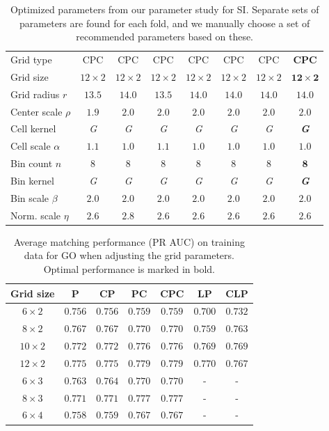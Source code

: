 \documentclass[thesis.tex]{subfiles}
\begin{document}
\begin{table}[p]
{\begin{tabular}{ l c c c c c c c}
Grid type & CPC & CPC & CPC & CPC & CPC & CPC & \textbf{CPC} \\
Grid size & $12 \times 2$ & $12 \times 2$ & $12 \times 2$ & $12 \times 2$ & $12 \times 2$ & $12 \times 2$ & \textbf{$\mathbf{12 \times 2}$} \\
Grid radius $r$ & $13.5$ & $14.0$ & $13.5$ & $14.0$ & $14.0$ & $14.0$ & $\mathbf{14.0}$ \\
Center scale $\rho$ & $1.9$ & $2.0$ & $2.0$ & $2.0$ & $2.0$ & $2.0$ & $\mathbf{2.0}$ \\
Cell kernel & \textit{G} & \textit{G} & \textit{G} & \textit{G} & \textit{G} & \textit{G} & \textbf{\textit{G}} \\
Cell scale $\alpha$ & $1.1$ & $1.0$ & $1.1$ & $1.0$ & $1.0$ & $1.0$ & $\mathbf{1.0}$ \\
Bin count $n$ & $8$ & $8$ & $8$ & $8$ & $8$ & $8$ & $\mathbf{8}$ \\
Bin kernel & \textit{G} & \textit{G} & \textit{G} & \textit{G} & \textit{G} & \textit{G} & \textbf{\textit{G}} \\
Bin scale $\beta$ & $2.0$ & $2.0$ & $2.0$ & $2.0$ & $2.0$ & $2.0$ & $\mathbf{2.0}$ \\
Norm. scale $\eta$ & $2.6$ & $2.8$ & $2.6$ & $2.6$ & $2.6$ & $2.6$ & $\mathbf{2.6}$ \\
\bottomrule
\end{tabular}}
\caption{Optimized parameters from our parameter study for SI. Separate sets of parameters are found for each fold, and we manually choose a set of recommended parameters based on these.}
\label{fig:ICparamsSi}
\end{table}
%
\begin{table}[tb]
\centering
\begin{tabular}{ c c c c c c c }
\toprule
Grid size & P & CP & PC & CPC & LP & CLP \\ \midrule
$6 \times 2$ & $0.756$ & $0.756$ & $0.759$ & $0.759$ & $0.700$ & $0.732$ \\ 
$8 \times 2$ & $0.767$ & $0.767$ & $0.770$ & $0.770$ & $0.759$ & $0.763$ \\ 
$10 \times 2$ & $0.772$ & $0.772$ & $0.776$ & $0.776$ & $0.769$ & $0.769$ \\ 
$12 \times 2$ & $0.775$ & $0.775$ & $\mathbf{0.779}$ & $0.779$ & $0.770$ & $0.767$ \\ 
$6 \times 3$ & $0.763$ & $0.764$ & $0.770$ & $0.770$ & - & - \\ 
$8 \times 3$ & $0.771$ & $0.771$ & $0.777$ & $0.777$ & - & - \\ 
$6 \times 4$ & $0.758$ & $0.759$ & $0.767$ & $0.767$ & - & - \\ 
\bottomrule
\end{tabular}
\caption{Average matching performance (PR AUC) on training data for GO when adjusting the grid parameters. Optimal performance is marked in bold.}
\label{tbl:dtuLayoutParametersGo}
\end{table}
\end{document}

